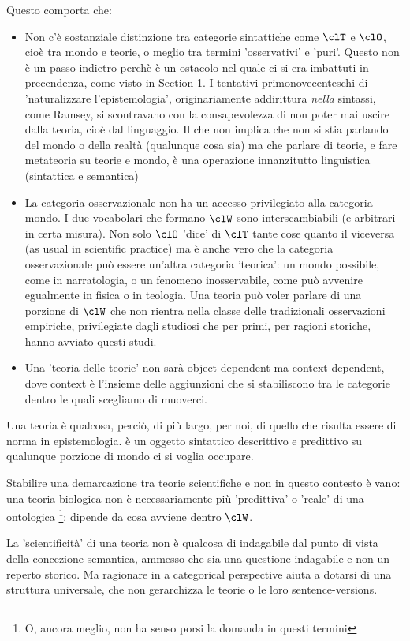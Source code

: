 Questo comporta che:
\begin{itemize}
    \item Non c'è sostanziale distinzione tra categorie sintattiche come $\clT$ e $\clO$, cioè tra mondo e teorie, o meglio tra termini 'osservativi' e 'puri'. Questo non è un passo indietro perchè è un ostacolo nel quale ci si era imbattuti in precendenza, come visto in Section 1. I tentativi primonovecenteschi di 'naturalizzare l'epistemologia', originariamente addirittura \emph{nella} sintassi, come Ramsey, si scontravano con la consapevolezza di non poter mai uscire dalla teoria, cioè dal linguaggio. Il che non implica che non si stia parlando del mondo o della realtà (qualunque cosa sia) ma che parlare di teorie, e fare metateoria su teorie e mondo, è una operazione innanzitutto linguistica (sintattica e semantica)
    \item La categoria osservazionale non ha un accesso privilegiato alla categoria mondo. I due vocabolari che formano $\clW$ sono interscambiabili (e arbitrari in certa misura). Non solo $\clO$ 'dice' di $\clT$ tante cose quanto il viceversa (as usual in scientific practice) ma è anche vero che la categoria osservazionale può essere un'altra categoria 'teorica': un mondo possibile, come in narratologia, o un fenomeno inosservabile, come può avvenire egualmente in fisica o in teologia. Una teoria può voler parlare di una porzione di $\clW$ che non rientra nella classe delle tradizionali osservazioni empiriche, privilegiate dagli studiosi che per primi, per ragioni storiche, hanno avviato questi studi. 
    \item Una 'teoria delle teorie' non sarà object-dependent ma context-dependent, dove context è l'insieme delle aggiunzioni che si stabiliscono tra le categorie dentro le quali scegliamo di muoverci. 
\end{itemize}

Una teoria è qualcosa, perciò, di più largo, per noi, di quello che risulta essere di norma in epistemologia. è un oggetto sintattico descrittivo e predittivo su qualunque porzione di mondo ci si voglia occupare.

Stabilire una demarcazione tra teorie scientifiche e non in questo contesto è vano: una teoria biologica non è necessariamente più 'predittiva' o 'reale' di una ontologica \footnote{O, ancora meglio, non ha senso porsi la domanda in questi termini}: dipende da cosa avviene dentro $\clW$. 

La 'scientificità' di una teoria non è qualcosa di indagabile dal punto di vista della concezione semantica, ammesso che sia una questione indagabile e non un reperto storico. Ma ragionare in a categorical perspective aiuta a dotarsi di una struttura universale, che non gerarchizza le teorie o le loro sentence-versions.   
